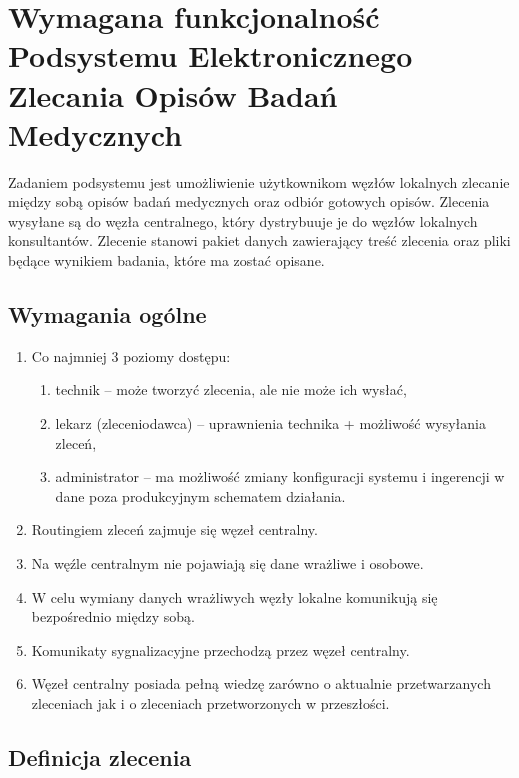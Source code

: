\documentclass[a4paper]{article}
\begin{document}
\section{Wymagana funkcjonalność Podsystemu Elektronicznego Zlecania Opisów Badań Medycznych}

Zadaniem podsystemu jest umożliwienie użytkownikom węzłów lokalnych zlecanie między sobą opisów badań medycznych oraz odbiór gotowych opisów. Zlecenia wysyłane są do węzła centralnego, który dystrybuuje je do węzłów lokalnych konsultantów. Zlecenie stanowi pakiet danych zawierający treść zlecenia oraz pliki będące wynikiem badania, które ma zostać opisane. 

\subsection{Wymagania ogólne}
\begin{enumerate}
\item Co najmniej 3 poziomy dostępu:
        \begin{enumerate}
        \item technik -- może tworzyć zlecenia, ale nie może ich wysłać,
        \item lekarz (zleceniodawca) -- uprawnienia technika + możliwość wysyłania zleceń,
        \item administrator -- ma możliwość zmiany konfiguracji systemu i ingerencji w dane poza produkcyjnym schematem działania.
        \end{enumerate}
\item Routingiem zleceń zajmuje się węzeł centralny.
\item Na węźle centralnym nie pojawiają się dane wrażliwe i osobowe.
\item W celu wymiany danych wrażliwych węzły lokalne komunikują się bezpośrednio między sobą.
\item Komunikaty sygnalizacyjne przechodzą przez węzeł centralny.
\item Węzeł centralny posiada pełną wiedzę zarówno o aktualnie przetwarzanych zleceniach jak i o zleceniach przetworzonych w przeszłości.
\end{enumerate}

\subsection{Definicja zlecenia}
\end{document}
